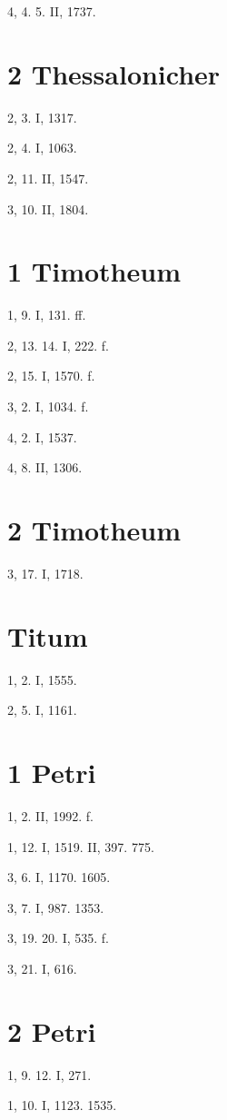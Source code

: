 4, 4. 5. II, 1737.

\section{2 Thessalonicher}

2, 3. I, 1317.

2, 4. I, 1063.

2, 11. II, 1547.

3, 10. II, 1804.

\section{1 Timotheum}

1, 9. I, 131. ff.

2, 13. 14. I, 222. f.

2, 15. I, 1570. f.

3, 2. I, 1034. f.

4, 2. I, 1537.

4, 8. II, 1306.

\section{2 Timotheum}

3, 17. I, 1718.

\section{Titum}

1, 2. I, 1555.

2, 5. I, 1161.

\section{1 Petri}

1, 2. II, 1992. f.

1, 12. I, 1519. II, 397. 775.

3, 6. I, 1170. 1605.

3, 7. I, 987. 1353.

3, 19. 20. I, 535. f.

3, 21. I, 616.

\section{2 Petri}

1, 9. 12. I, 271.

1, 10. I, 1123. 1535.

